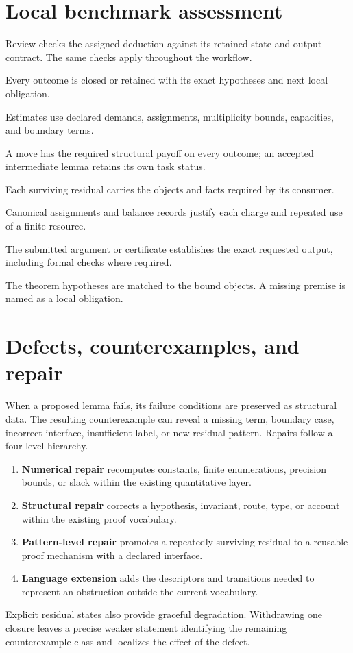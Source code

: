 \documentclass[11pt]{article}
\begin{document}
\section{Local benchmark assessment}
Review checks the assigned deduction against its retained state and output
contract. The same checks apply throughout the workflow.
\begin{description}[style=nextline,itemsep=0.35em]
\item[Coverage.] Every outcome is closed or retained with its exact hypotheses
and next local obligation.
\item[Quantitative accounting.] Estimates use declared demands, assignments,
multiplicity bounds, capacities, and boundary terms.
\item[Productive composition.] A move has the required structural payoff on
every outcome; an accepted intermediate lemma retains its own task status.
\item[State retention.] Each surviving residual carries the objects and facts
required by its consumer.
\item[Resource use.] Canonical assignments and balance records justify each
charge and repeated use of a finite resource.
\item[Evidence.] The submitted argument or certificate establishes the exact
requested output, including formal checks where required.
\item[Textbook application.] The theorem hypotheses are matched to the bound
objects. A missing premise is named as a local obligation.
\end{description}
\section{Defects, counterexamples, and repair}
When a proposed lemma fails, its failure conditions are preserved as
structural data. The resulting counterexample can reveal a missing term,
boundary case, incorrect interface, insufficient label, or new residual
pattern. Repairs follow a four-level hierarchy.
\begin{enumerate}[leftmargin=*,label=\textbf{\arabic*.},itemsep=0.35em]
\item \textbf{Numerical repair} recomputes constants, finite enumerations,
precision bounds, or slack within the existing quantitative layer.
\item \textbf{Structural repair} corrects a hypothesis, invariant, route,
type, or account within the existing proof vocabulary.
\item \textbf{Pattern-level repair} promotes a repeatedly surviving residual
to a reusable proof mechanism with a declared interface.
\item \textbf{Language extension} adds the descriptors and transitions needed
to represent an obstruction outside the current vocabulary.
\end{enumerate}
Explicit residual states also provide graceful degradation. Withdrawing one
closure leaves a precise weaker statement identifying the remaining
counterexample class and localizes the effect of the defect.
\end{document}
